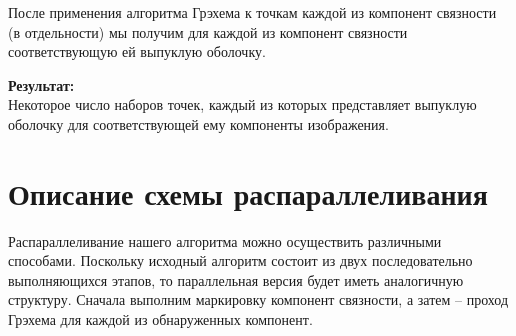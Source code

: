\documentclass[14pt, russian]{extarticle}
\begin{document}
	После применения алгоритма Грэхема к точкам каждой из компонент связности (в отдельности) мы получим для каждой из компонент связности соответствующую ей выпуклую оболочку.

	\noindent\textbf{Результат:}\\
	Некоторое число наборов точек, каждый из которых представляет выпуклую оболочку для соответствующей ему компоненты изображения.
	\newpage
	
	\section{Описание схемы распараллеливания}
	Распараллеливание нашего алгоритма можно осуществить различными способами. Поскольку исходный алгоритм состоит из двух последовательно выполняющихся этапов, то параллельная версия будет иметь аналогичную структуру. Сначала выполним маркировку компонент связности, а затем – проход Грэхема для каждой из обнаруженных компонент.
\end{document}
